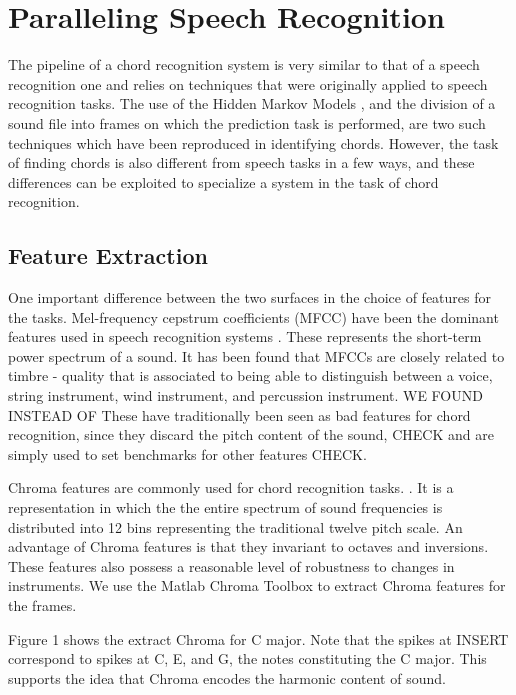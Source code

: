 \documentclass{article}
\begin{document}
\section{Paralleling Speech Recognition}

The pipeline of a chord recognition system is very similar to that of a speech recognition one and relies on techniques that were originally applied to speech recognition tasks. The use of the Hidden Markov Models \cite{young} , and the division of a sound file into frames on which the prediction task is performed, are two such techniques which have been reproduced in identifying chords. However, the task of finding chords is also different from speech tasks in a few ways, and these differences can be exploited to specialize a system in the task of chord recognition.

\subsection{Feature Extraction}

One important difference between the two surfaces in the choice of features for the tasks. Mel-frequency cepstrum coefficients (MFCC) have been the dominant features used in speech recognition systems \cite{young}. These represents the short-term power spectrum of a sound. It has been found that MFCCs are closely related to timbre - quality that is associated to being able to distinguish between a voice, string instrument, wind instrument, and percussion instrument. WE FOUND INSTEAD OF These have traditionally been seen as bad features for chord recognition, since they discard the pitch content of the sound, CHECK and are simply used to set benchmarks for other features CHECK.

Chroma features are commonly used for chord recognition tasks. \fujishima. It is a representation in which the the entire spectrum of sound frequencies is distributed into 12 bins representing the traditional twelve pitch scale. An advantage of Chroma features is that they invariant to octaves and inversions. These features also possess a reasonable level of robustness to changes in instruments. We use the Matlab Chroma Toolbox to extract Chroma features for the frames.

Figure 1 shows the extract Chroma for C major. Note that the spikes at INSERT correspond to spikes at C, E, and G, the notes constituting the C major. This supports the idea that Chroma encodes the harmonic content of sound.
\end{document}
